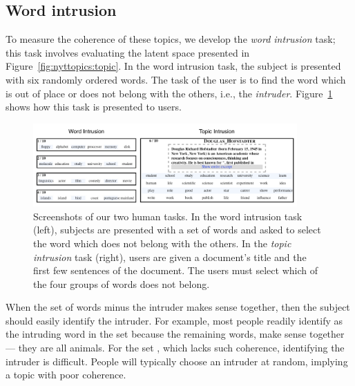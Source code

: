 \subsection{Word intrusion}
\label{sec:wordintrusion}
To measure the coherence of these topics, we develop the \emph{word
intrusion} task; this task involves evaluating the latent space
presented in Figure~\ref{fig:nyttopics:topic}.  In the word intrusion
task, the subject is presented with six randomly ordered words.  The
task of the user is to find the word which is out of place or does not
belong with the others, i.e., the \emph{intruder}.
Figure~\ref{fig:intruding_word} shows how this task is presented to
users.

\begin{figure}[t]
\centering

\includegraphics[width=0.90\textwidth]{figures/screenshots}

\caption{Screenshots of our two human tasks. In the word intrusion
  task (left), subjects are presented with a set of words and asked to
  select the word which does not belong with the others.  In the
  \emph{topic intrusion} task (right), users are given a document's
  title and the first few sentences of the document.  The users must
  select which of the four groups of words does not belong.}
\label{fig:intruding_word}
\end{figure}

When the set of words minus the intruder makes sense together, then
the subject should easily identify the intruder.  For example, most
people readily identify  as the intruding word in the set
 because the remaining
words,  make sense together ---
they are all animals.  For the set , which lacks such coherence, identifying
the intruder is difficult.  People will typically choose an
intruder at random, implying a topic with poor coherence.


